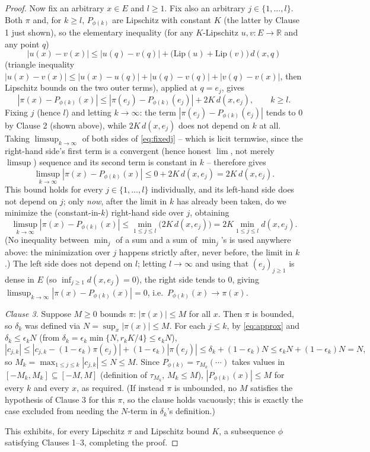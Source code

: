 \begin{proof}
  Now fix an arbitrary $x \in E$ and $l \ge 1$. Fix also an arbitrary $j \in \{1,\dots,l\}$. Both
  $\pi$ and, for $k \ge l$, $P_{\phi(k)}$ are Lipschitz with constant $K$ (the latter by Clause 1
  just shown), so the elementary inequality (for any $K$-Lipschitz $u,v \colon E \to \mathbb{R}$
  and any point $q$)
  \[
    |u(x)-v(x)| \le |u(q)-v(q)| + \bigl(\mathrm{Lip}(u)+\mathrm{Lip}(v)\bigr)\,d(x,q)
  \]
  (triangle inequality $|u(x)-v(x)| \le |u(x)-u(q)|+|u(q)-v(q)|+|v(q)-v(x)|$, then Lipschitz bounds
  on the two outer terms), applied at $q = e_j$, gives
  \begin{equation}\label{eq:fixedj}
    |\pi(x)-P_{\phi(k)}(x)| \le |\pi(e_j)-P_{\phi(k)}(e_j)| + 2K\,d(x,e_j)
    , \qquad k \ge l
    .
  \end{equation}
  Fixing $j$ (hence $l$) and letting $k \to \infty$: the term $|\pi(e_j)-P_{\phi(k)}(e_j)|$ tends
  to $0$ by Clause 2 (shown above), while $2K\,d(x,e_j)$ does not depend on $k$ at all. Taking
  $\limsup_{k\to\infty}$ of both sides of \eqref{eq:fixedj} -- which is licit termwise, since the
  right-hand side's first term is a convergent (hence honest $\lim$, not merely $\limsup$)
  sequence and its second term is constant in $k$ -- therefore gives
  \[
    \limsup_{k\to\infty} |\pi(x)-P_{\phi(k)}(x)| \le 0 + 2K\,d(x,e_j) = 2K\,d(x,e_j)
    .
  \]
  This bound holds for every $j \in \{1,\dots,l\}$ individually, and its left-hand side does not
  depend on $j$; only \emph{now}, after the limit in $k$ has already been taken, do we minimize the
  (constant-in-$k$) right-hand side over $j$, obtaining
  \[
    \limsup_{k\to\infty} |\pi(x)-P_{\phi(k)}(x)| \le \min_{1\le j\le l} \bigl(2K\,d(x,e_j)\bigr)
      = 2K \min_{1\le j\le l} d(x,e_j)
    .
  \]
  (No inequality between $\min_j$ of a sum and a sum of $\min_j$'s is used anywhere above: the
  minimization over $j$ happens strictly after, never before, the limit in $k$.) The left side does
  not depend on $l$; letting $l \to \infty$ and using that $(e_j)_{j \ge 1}$ is dense in $E$ (so
  $\inf_{j\ge1} d(x,e_j) = 0$), the right side tends to $0$, giving
  $\limsup_{k\to\infty}|\pi(x)-P_{\phi(k)}(x)| = 0$, i.e.\ $P_{\phi(k)}(x) \to \pi(x)$.

  \emph{Clause 3.} Suppose $M \ge 0$ bounds $\pi$: $|\pi(x)| \le M$ for all $x$. Then $\pi$ is
  bounded, so $\delta_k$ was defined via $N = \sup_x|\pi(x)| \le M$. For each $j \le k$, by
  \eqref{eq:approx} and $\delta_k \le \epsilon_k N$ (from $\delta_k = \epsilon_k\min\{N,r_kK/4\} \le
  \epsilon_k N$),
  \[
    |c_{j,k}| \le |c_{j,k}-(1-\epsilon_k)\pi(e_j)| + (1-\epsilon_k)|\pi(e_j)|
      \le \delta_k + (1-\epsilon_k)N \le \epsilon_k N + (1-\epsilon_k)N = N
    ,
  \]
  so $M_k = \max_{1\le j\le k}|c_{j,k}| \le N \le M$. Since $P_{\phi(k)} = \tau_{M_k}(\cdots)$ takes
  values in $[-M_k,M_k] \subseteq [-M,M]$ (definition of $\tau_{M_k}$, $M_k \le M$),
  $|P_{\phi(k)}(x)| \le M$ for every $k$ and every $x$, as required. (If instead $\pi$ is
  unbounded, no $M$ satisfies the hypothesis of Clause 3 for this $\pi$, so the clause holds
  vacuously; this is exactly the case excluded from needing the $N$-term in $\delta_k$'s
  definition.)

  This exhibits, for every Lipschitz $\pi$ and Lipschitz bound $K$, a subsequence $\phi$
  satisfying Clauses 1--3, completing the proof.
\end{proof}
